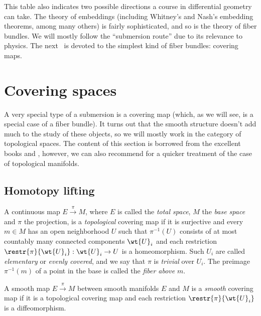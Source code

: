 This table also indicates two possible directions a course in differential geometry can take. The theory of embeddings (including Whitney's and Nash's embedding theorems, among many others) is fairly sophisticated, and so is the theory of fiber bundles. We will mostly follow the ``submersion route'' due to its relevance to physics. The next \chap\ is devoted to the simplest kind of fiber bundles: covering maps.


\clearpage

\chapter{Covering spaces}

A very special type of a submersion is a covering map (which, as we will see, is a special case of a fiber bundle). It turns out that the smooth structure doesn't add much to the study of these objects, so we will mostly work in the category of topological spaces. The content of this section is borrowed from the excellent books \cite{Bredon} and  \cite{tomDieck}, however, we can also recommend \cite[Ch.~11]{LeeTop} for a quicker treatment of the case of topological manifolds.


\section{Homotopy lifting}



\begin{defn}
    A continuous map $E\overset{\pi}{\to} M$, where $E$ is called the \emph{total space}, $M$ the \emph{base space} and $\pi$ the projection, is a \emph{topological} covering map if it is surjective and every $m\in M$ has an open neighborhood $U$ such that $\pi^{-1}(U)$ consists of at most countably many connected components $\wt{U}_i$ and each restriction $\restr{\pi}{\wt{U}_i}:\wt{U}_i\to U$ is a homeomorphism. Such $U_i$ are called \emph{elementary} or \emph{evenly covered}, and we say that $\pi$ is \emph{trivial} over $U_i$. The preimage $\pi^{-1}(m)$ of a point in the base is called the \emph{fiber above} $m$.
\end{defn}

\begin{defn}
    A smooth map $E\overset{\pi}{\to} M$ between smooth manifolds $E$ and $M$ is a \emph{smooth} covering map if it is a topological covering map and each restriction $\restr{\pi}{\wt{U}_i}$ is a diffeomorphism.
\end{defn}

